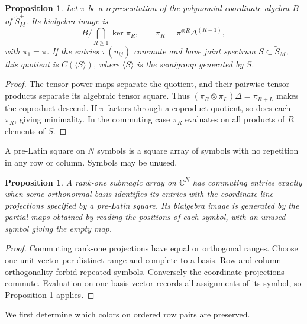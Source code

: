 \documentclass[11pt,a4paper]{article}
\newtheorem{prop}[thm]{Proposition}
\begin{document}
\begin{prop}\label{bialg}
Let $\pi$ be a representation of the polynomial coordinate algebra $B$ of $\widetilde S_M^+$. Its bialgebra image is
\[
 B\Big/\bigcap_{R\geq1}\ker\pi_R,\qquad \pi_R=\pi^{\otimes R}\Delta^{(R-1)},
\]
with $\pi_1=\pi$. If the entries $\pi(u_{ij})$ commute and have joint spectrum $S\subset\widetilde S_M$, this quotient is $C(\langle S\rangle)$, where $\langle S\rangle$ is the semigroup generated by $S$.
\end{prop}
\begin{proof}
The tensor-power maps separate the quotient, and their pairwise tensor products separate its algebraic tensor square. Thus $(\pi_R\otimes\pi_L)\Delta=\pi_{R+L}$ makes the coproduct descend. If $\pi$ factors through a coproduct quotient, so does each $\pi_R$, giving minimality. In the commuting case $\pi_R$ evaluates on all products of $R$ elements of $S$.
\end{proof}

A pre-Latin square on $N$ symbols is a square array of symbols with no repetition in any row or column. Symbols may be unused.

\begin{prop}\label{latin}
A rank-one submagic array on $\mathbb C^N$ has commuting entries exactly when some orthonormal basis identifies its entries with the coordinate-line projections specified by a pre-Latin square. Its bialgebra image is generated by the partial maps obtained by reading the positions of each symbol, with an unused symbol giving the empty map.
\end{prop}
\begin{proof}
Commuting rank-one projections have equal or orthogonal ranges. Choose one unit vector per distinct range and complete to a basis. Row and column orthogonality forbid repeated symbols. Conversely the coordinate projections commute. Evaluation on one basis vector records all assignments of its symbol, so Proposition \ref{bialg} applies.
\end{proof}

We first determine which colors on ordered row pairs are preserved.
\end{document}
